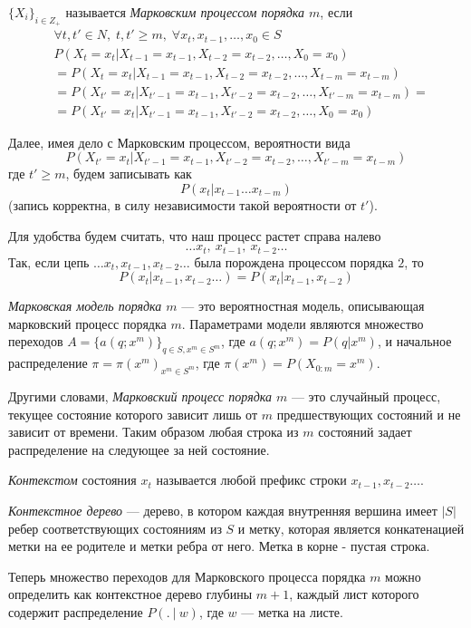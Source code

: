 \documentclass{matmex-diploma-custom}
\begin{document}
\begin{definition} $ \{X_{i}\}_{i \in Z_{+}}$ называется \emph{Марковским процессом порядка $ m $}, если  
\begin{align*}
&\forall t, t'\in N, \;t, t' \geq m,\; \forall x_{t},x_{t-1},\ldots ,x_{0}\in S
\\& P(X_{t} = x_{t}|X_{t-1}=x_{t-1},X_{t-2}=x_{t-2}, \ldots ,X_{0}=x_{0}) 
\\&=P(X_{t} = x_{t}|X_{t-1}=x_{t-1},X_{t-2}=x_{t-2}, \ldots ,X_{t-m}=x_{t-m})
\\&=P(X_{t'} = x_{t}|X_{t'-1}=x_{t-1},X_{t'-2}=x_{t-2}, \ldots ,X_{t'-m}=x_{t-m})=
\\&=P(X_{t'} = x_{t}|X_{t'-1}=x_{t-1},X_{t'-2}=x_{t-2}, \ldots ,X_{0}=x_{0}) 
\end{align*}
\label{MP}
\end{definition}
Далее, имея дело с Марковским процессом, вероятности вида  
$$P(X_{t'} = x_{t}|X_{t'-1}=x_{t-1},X_{t'-2}=x_{t-2}, \ldots ,X_{t'-m}=x_{t-m})$$ где $t'\geq m$, будем записывать как $$P(x_{t} |x_{t-1}\ldots x_{t-m})$$ (запись корректна, в силу независимости такой вероятности от $t'$).

Для удобства будем считать, что наш процесс растет справа налево  
$$\ldots x_{t},~ x_{t-1},~ x_{t-2} \ldots$$
Так,  если цепь $\ldots x_{t}, x_{t-1}, x_{t-2} \ldots$ была порождена процессом порядка $2$,
то $$P(x_{t}| x_{t-1},x_{t-2}\ldots) = P(x_{t}|x_{t-1},x_{t-2})$$

\begin{definition} \emph{Марковская модель порядка $ m $} --- это вероятностная модель, описывающая марковский процесс порядка $m$. Параметрами модели являются множество переходов  $ A = \{a(q; x^{m})\}_{q \in S, x^{m} \in S^{m}}$, где $a(q; x^{m}) = P(q|x^{m})$, и начальное распределение $\pi = \pi(x^m)_{x^m \in S^m}$, где $\pi(x^m) = P(X_{0:m}=x^m)$.
\end{definition}

Другими словами, \textit{Марковский процесс порядка $m$} --- это случайный процесс, текущее состояние которого зависит лишь от $m$ предшествующих состояний и не зависит от времени. Таким образом любая строка из $m$ состояний задает распределение на следующее за ней состояние. 

\textit{Контекстом} состояния $ x_{t} $  называется любой префикс строки  $x_{t-1}, x_{t-2} \ldots$. 

\begin{definition}
\textit{Контекстное дерево} --- дерево, в котором каждая внутренняя вершина имеет $ |S| $ ребер соответствующих состояниям из $S$ и метку, которая является конкатенацией метки на ее родителе и метки ребра от него. Метка в корне - пустая строка.
\end{definition}
Теперь множество переходов для Марковского процесса порядка $ m $ можно определить как контекстное дерево глубины $ m+1 $, каждый лист которого содержит распределение $P(.~|~w)$, где $ w $ --- метка на листе.
\end{document}
